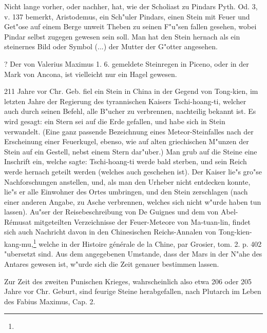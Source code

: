 \documentclass[a4paper, 11pt, oneside, polutonikogreek, german]{article}
\begin{document}
Nicht lange vorher, oder nachher, hat, wie der Scholiast zu Pindars Pyth. Od. 3, v. 137 bemerkt, Aristodemus, ein Sch"uler Pindars, einen Stein mit Feuer und Get"ose auf einem Berge unweit Theben zu seinen F"u"sen fallen gesehen, wobei Pindar selbst zugegen gewesen sein soll. Man hat den Stein hernach als ein steinernes Bild oder Symbol (...) der Mutter der G"otter angesehen.

? Der von Valerius Maximus 1. 6. gemeldete Steinregen in Piceno, oder in der Mark von Ancona, ist vielleicht nur ein Hagel gewesen.

211 Jahre vor Chr. Geb. fiel ein Stein in China in der Gegend von Tong-kien, im letzten Jahre der Regierung des tyrannischen Kaisers Tschi-hoang-ti, welcher auch durch seinen Befehl, alle B"ucher zu verbrennen, nachteilig bekannt ist. Es wird gesagt: ein Stern sei auf die Erde gefallen, und habe sich in Stein verwandelt. (Eine ganz passende Bezeichnung eines Meteor-Steinfalles nach der Erscheinung einer Feuerkugel, ebenso, wie auf alten griechischen M"unzen der Stein auf ein Gestell, nebst einem Stern dar"uber.) Man grub auf die Steine eine Inschrift ein, welche sagte: Tschi-hoang-ti werde bald sterben, und sein Reich werde hernach geteilt werden (welches auch geschehen ist). Der Kaiser lie"s gro"se Nachforschungen anstellen, und, als man den Urheber nicht entdecken konnte, lie"s er alle Einwohner des Ortes umbringen, und den Stein zerschlagen (nach einer anderen Angabe, zu Asche verbrennen, welches sich nicht w"urde haben tun lassen). Au"ser der Reisebeschreibung von De Guignes und dem von Abel-Rémusat mitgeteilten Verzeichnisse der Feuer-Meteore von Ma-tuan-lin, findet sich auch Nachricht davon in den Chinesischen Reichs-Annalen von Tong-kien-kang-mu,\footnote{} welche in der Histoire générale de la Chine, par Grosier, tom. 2. p. 402 "ubersetzt sind. Aus dem angegebenen Umstande, dass der Mars in der N"ahe des Antares gewesen ist, w"urde sich die Zeit genauer bestimmen lassen.

Zur Zeit des zweiten Punischen Krieges, wahrscheinlich also etwa 206 oder 205 Jahre vor Chr. Geburt, sind feurige Steine herabgefallen, nach Plutarch im Leben des Fabius Maximus, Cap. 2.
\end{document}
